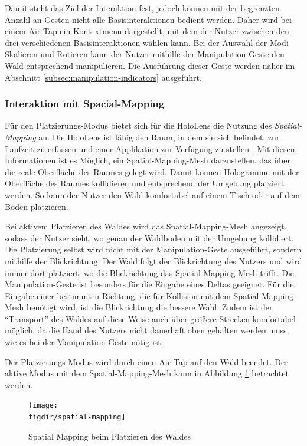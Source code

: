 Damit steht das Ziel der Interaktion fest, jedoch können mit der begrenzten Anzahl an Gesten nicht alle Basisinteraktionen bedient werden. Daher wird bei einem Air-Tap ein Kontextmenü dargestellt, mit dem der Nutzer zwischen den drei verschiedenen Basisinteraktionen wählen kann. Bei der Auswahl der Modi Skalieren und Rotieren kann der Nutzer mithilfe der Manipulation-Geste den Wald entsprechend manipulieren. Die Ausführung dieser Geste werden näher im Abschnitt \ref{subsec:manipulation-indicators} ausgeführt.

\subsubsection*{Interaktion mit Spacial-Mapping}
Für den Platzierungs-Modus bietet sich für die HoloLens die Nutzung des \textit{Spatial-Mapping} an. Die HoloLens ist fähig den Raum, in dem sie sich befindet, zur Laufzeit zu erfassen und einer Applikation zur Verfügung zu stellen \cite{windows2017spacial}. Mit diesen Informationen ist es Möglich, ein Spatial-Mapping-Mesh darzustellen, das über die reale Oberfläche des Raumes gelegt wird. Damit können Hologramme mit der Oberfläche des Raumes kollidieren und entsprechend der Umgebung platziert werden. So kann der Nutzer den Wald komfortabel auf einem Tisch oder auf dem Boden platzieren.

Bei aktivem Platzieren des Waldes wird das Spatial-Mapping-Mesh angezeigt, sodass der Nutzer sieht, wo genau der Waldboden mit der Umgebung kollidiert. Die Platzierung selbst wird nicht mit der Manipulation-Geste ausgeführt, sondern mithilfe der Blickrichtung. Der Wald folgt der Blickrichtung des Nutzers und wird immer dort platziert, wo die Blickrichtung das Spatial-Mapping-Mesh trifft. Die Manipulation-Geste ist besonders für die Eingabe eines Deltas geeignet. Für die Eingabe einer bestimmten Richtung, die für Kollision mit dem Spatial-Mapping-Mesh benötigt wird, ist die Blickrichtung die bessere Wahl. Zudem ist der "`Transport"' des Waldes auf diese Weise auch über größere Strecken komfortabel möglich, da die Hand des Nutzers nicht dauerhaft oben gehalten werden muss, wie es bei der Manipulation-Geste nötig ist.

Der Platzierungs-Modus wird durch einen Air-Tap auf den Wald beendet. Der aktive Modus mit dem Spatial-Mapping-Mesh kann in Abbildung \ref{fig:spatial-mapping} betrachtet werden.

\begin{figure}[htb]
  \texttt{[image: \\figdir/spatial-mapping]}
  \caption{Spatial Mapping beim Platzieren des Waldes}
  \label{fig:spatial-mapping}
\end{figure}

